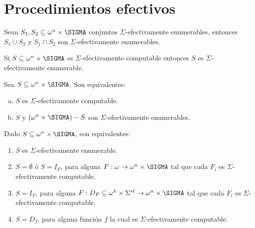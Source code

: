 \section{Procedimientos efectivos}

  \begin{lemma}
    \par Sean $S_{1}, S_{2} \subseteq \omega^{n} \times \SIGMA$ conjuntos $\Sigma$-efectivamente enumerables, entonces
    $S_{1} \cup S_{2}$ y $S_{1} \cap S_{2}$ son $\Sigma$-efectivamente enumerables.
  \end{lemma}

  \begin{lemma}
    \par Si $S \subseteq \omega^{n} \times \SIGMA$ es $\Sigma$-efectivamente computable entonces $S$ es
    $\Sigma$-efectivamente enumerable.
  \end{lemma}

  \begin{theorem}
    \par Sea $S \subseteq \omega^{n}\times \SIGMA$. Son equivalentes:

    \begin{enumerate}[a)]
      \item $S$ es $\Sigma$-efectivamente computable.
      \item $S$ y $(\omega^{n}\times \SIGMA)-S$ son $\Sigma$-efectivamente enumerables.
    \end{enumerate}
  \end{theorem}

  \begin{theorem}
    \par Dado $S \subseteq \omega^{n} \times \SIGMA$, son equivalentes:

    \begin{enumerate}
      \item $S$ es $\Sigma$-efectivamente enumerable.
      \item $S = \emptyset$ ó $S = I_{F}$, para alguna $F: \omega \rightarrow \omega^{n} \times \SIGMA$ tal que cada
        $F_{i}$ es $\Sigma$-efectivamente computable.
      \item $S = I_{F}$, para alguna $F:D_{F} \subseteq \omega^{k} \times \Sigma^{\ast l} \rightarrow \omega^{n} \times
        \SIGMA$ tal que cada $F_{i}$ es $\Sigma$-efectivamente computable.
      \item $S = D_{f}$, para alguna función $f$ la cual es $\Sigma$-efectivamente computable.
    \end{enumerate}
  \end{theorem}
